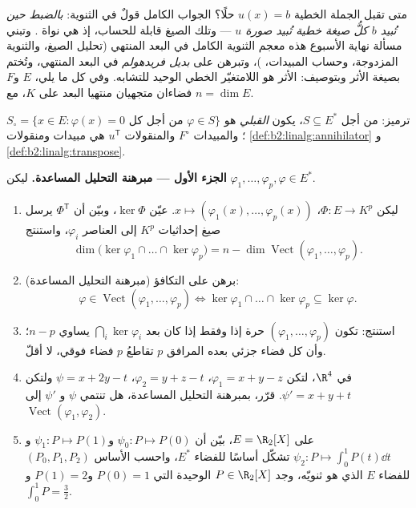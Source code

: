 متى تقبل الجملة الخطية $u(x) = b$ حلًا؟ الجواب
الكامل قولٌ في الثنوية: \emph{بالضبط حين تُبيد $b$
كلُّ صيغة خطية تُبيد صورة $u$} --- وتلك الصيغ قابلة
للحساب، إذ هي نواة . وتبني مسألة نهاية الأسبوع هذه
معجم الثنوية الكامل في البعد المنتهي (تحليل الصيغ، والثنوية
المزدوجة، وحساب المبيدات، )، وتبرهن على
\emph{بديل فريدهولم} في البعد المنتهي، وتُختم بصيغة الأثر
وبتوصيف: الأثر هو اللامتغيّر الخطي الوحيد للتشابه. وفي كل ما
يلي، $E$ و$F$ فضاءان متجهيان منتهيا البعد على $K$،
مع $n = \dim E$.

\begin{problem}
\label{pb:b2:linalg:1}
ترميز: من أجل $S \subseteq E^*$، يكون \emph{ القبلي} هو
$S_\circ = \{x \in E : \varphi(x) = 0 \text{ من أجل كل } \varphi
\in S\}$؛ والمبيدات $F^\circ$ والمنقولات $u^{\mathsf T}$
هي مبيدات ومنقولات \cref{def:b2:linalg:annihilator} و
\cref{def:b2:linalg:transpose}.

\medskip
\noindent\textbf{الجزء الأول --- مبرهنة التحليل المساعدة.} ليكن
$\varphi_1, \dots, \varphi_p, \varphi \in E^*$.
\begin{enumerate}
  \item ليكن $\Phi \colon E \to K^p$، $x \mapsto (\varphi_1(x),
        \dots, \varphi_p(x))$. عيّن $\ker\Phi$، وبيّن
        أن $\Phi^{\mathsf T}$ يرسل صيغ إحداثيات $K^p$ إلى
        العناصر $\varphi_i$، واستنتج
        \[
        \dim \bigl(\ker\varphi_1 \cap \dots \cap
        \ker\varphi_p\bigr) = n - \dim
        \operatorname{Vect}(\varphi_1, \dots, \varphi_p).
        \]
  \item (مبرهنة التحليل المساعدة) برهن على التكافؤ:
        \[
        \varphi \in \operatorname{Vect}(\varphi_1, \dots,
        \varphi_p)
        \iff
        \ker\varphi_1 \cap \dots \cap \ker\varphi_p \subseteq
        \ker\varphi .
        \]
  \item استنتج: تكون $(\varphi_1, \dots, \varphi_p)$ حرة إذا وفقط إذا
        كان بعد $\bigcap_i \ker\varphi_i$ يساوي $n - p$؛ وأن
        كل فضاء جزئي بعده المرافق $p$ تقاطعُ $p$
        فضاء فوقي، لا أقلّ.
  \item في $\R^4$، لتكن $\varphi_1 = x + y - z$، $\varphi_2 = y +
        z - t$، $\psi = x + 2y - t$ ولتكن $\psi' = x + y + t$.
        قرّر، بمبرهنة التحليل المساعدة، هل تنتمي $\psi$ و
        $\psi'$ إلى $\operatorname{Vect}(\varphi_1,
        \varphi_2)$.
  \item على $E = \R_2[X]$، بيّن أن $\psi_0 \colon P \mapsto
        P(0)$ و$\psi_1 \colon P \mapsto P(1)$ و$\psi_2 \colon P
        \mapsto \int_0^1 P(t)\dd t$ تشكّل أساسًا للفضاء $E^*$،
        واحسب الأساس $(P_0, P_1, P_2)$ للفضاء $E$ الذي هو
        ثنويّه، وجد $P \in \R_2[X]$ الوحيدة التي $P(0)
        = 1$ و$P(1) = 2$ و$\int_0^1 P = \frac32$.
\end{enumerate}


\end{problem}

